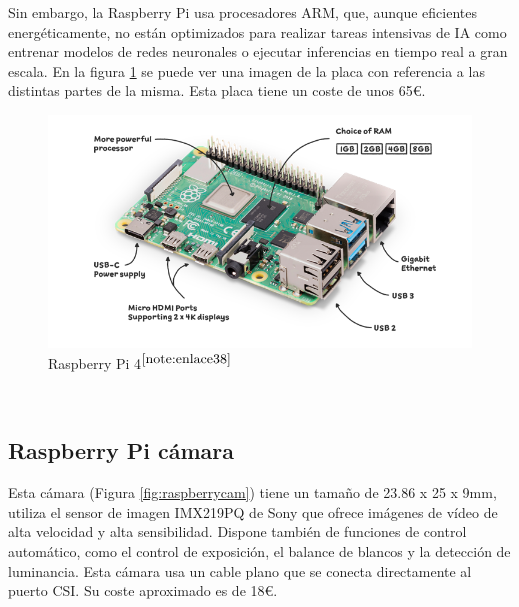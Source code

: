  Sin embargo, la Raspberry Pi usa procesadores ARM, que, aunque eficientes energéticamente, no están optimizados para realizar tareas intensivas de \ac{IA} como entrenar modelos de redes neuronales o ejecutar inferencias en tiempo real a gran escala. En la figura \ref{fig:raspberry} se puede ver una imagen de la placa con referencia a las distintas partes de la misma. Esta placa tiene un coste de unos 65€. 


\begin{figure} [h!]
	\begin{center}
		\includegraphics[width=14cm]{figs/raspberrypi4.png}
	\end{center}
	\caption{Raspberry Pi 4$^{\ref{note:enlace38}}$} 
\label{fig:raspberry}
\end{figure}\

\setcounter{footnote}{38} %

\subsection{Raspberry Pi cámara}

Esta cámara (Figura \ref{fig:raspberrycam}) tiene un tamaño de  23.86 x 25 x 9mm, utiliza el sensor de imagen IMX219PQ de Sony que ofrece imágenes de vídeo de alta velocidad y alta sensibilidad. Dispone también de funciones de control automático, como el control de exposición, el balance de blancos y la detección de luminancia. Esta cámara usa un cable plano que se conecta directamente al puerto \ac{CSI}. Su coste aproximado es de 18€. 



